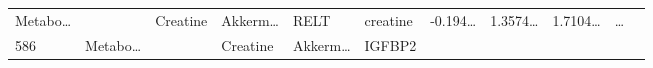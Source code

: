 \documentclass[
]{article}
\begin{document}
\begin{longtable}[]{@{}lllllllllll@{}}
\begin{minipage}[t]{0.07\columnwidth}
Metabo\ldots{}\strut
\end{minipage} & \begin{minipage}[t]{0.07\columnwidth}\raggedright
\strut
\end{minipage} & \begin{minipage}[t]{0.09\columnwidth}\raggedright
Creatine\strut
\end{minipage} & \begin{minipage}[t]{0.07\columnwidth}\raggedright
Akkerm\ldots{}\strut
\end{minipage} & \begin{minipage}[t]{0.07\columnwidth}\raggedright
RELT\strut
\end{minipage} & \begin{minipage}[t]{0.09\columnwidth}\raggedright
creatine\strut
\end{minipage} & \begin{minipage}[t]{0.07\columnwidth}\raggedright
-0.194\ldots{}\strut
\end{minipage} & \begin{minipage}[t]{0.07\columnwidth}\raggedright
1.3574\ldots{}\strut
\end{minipage} & \begin{minipage}[t]{0.07\columnwidth}\raggedright
1.7104\ldots{}\strut
\end{minipage} & \begin{minipage}[t]{0.03\columnwidth}\raggedright
\ldots{}\strut
\end{minipage}\tabularnewline
\begin{minipage}[t]{0.03\columnwidth}\raggedright
586\strut
\end{minipage} & \begin{minipage}[t]{0.07\columnwidth}\raggedright
Metabo\ldots{}\strut
\end{minipage} & \begin{minipage}[t]{0.07\columnwidth}\raggedright
\strut
\end{minipage} & \begin{minipage}[t]{0.09\columnwidth}\raggedright
Creatine\strut
\end{minipage} & \begin{minipage}[t]{0.07\columnwidth}\raggedright
Akkerm\ldots{}\strut
\end{minipage} & \begin{minipage}[t]{0.07\columnwidth}\raggedright
IGFBP2\strut
\end{minipage} & \begin{minipage}[t]{0.09\columnwidth}\raggedright

\end{minipage}
\end{longtable}
\end{document}
